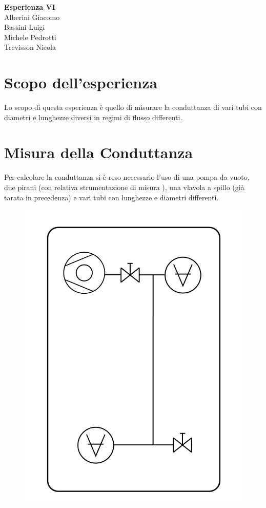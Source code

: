 \documentclass[a4paper,11pt]{article}
\begin{document}
\begin{center}
\textbf{\huge Esperienza VI} \\ \vspace{10pt}
\large Alberini Giacomo \\ Bassini Luigi \\ Michele Pedrotti\\ Trevisson Nicola 
\end{center}
\section{Scopo dell'esperienza}
Lo scopo di questa esperienza è quello di misurare la conduttanza di vari tubi con diametri e lunghezze diversi in regimi di flusso differenti.
\section{Misura della Conduttanza}

Per calcolare la conduttanza si è reso necessario l'uso di una pompa da vuoto, due pirani (con relativa strumentazione di misura ), una vlavola a spillo (già tarata in precedenza) e vari tubi con lunghezze e diametri differenti.

	
\begin{center} 
\begin{figure}[htpd]
\hspace{120pt}
\includegraphics[scale=0.5]{schema_finale.png}
\end{figure}
\end{center}
\end{document}
